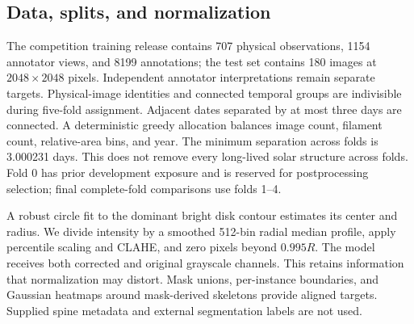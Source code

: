 \documentclass[sigconf]{acmart}
\begin{document}
\subsection{Data, splits, and normalization}
The competition training release contains 707 physical observations, 1154 annotator views, and 8199 annotations; the test set contains 180 images at $2048\times2048$ pixels. Independent annotator interpretations remain separate targets. Physical-image identities and connected temporal groups are indivisible during five-fold assignment. Adjacent dates separated by at most three days are connected. A deterministic greedy allocation balances image count, filament count, relative-area bins, and year. The minimum separation across folds is 3.000231 days. This does not remove every long-lived solar structure across folds. Fold 0 has prior development exposure and is reserved for postprocessing selection; final complete-fold comparisons use folds 1--4.

A robust circle fit to the dominant bright disk contour estimates its center and radius. We divide intensity by a smoothed 512-bin radial median profile, apply percentile scaling and CLAHE, and zero pixels beyond $0.995R$. The model receives both corrected and original grayscale channels. This retains information that normalization may distort. Mask unions, per-instance boundaries, and Gaussian heatmaps around mask-derived skeletons provide aligned targets. Supplied spine metadata and external segmentation labels are not used.
\end{document}
